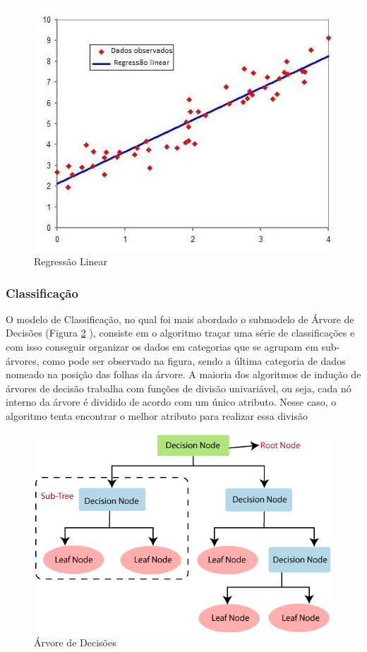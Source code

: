 \documentclass[
	article,			%
	12pt,				%
	oneside,			%
	a4paper,			%
	section=TITLE,		%
	subsection=TITLE,	%
	english,			%
	brazil,				%
	sumario=tradicional
	]{abntex2}
\begin{document}
\begin{figure}[H]
    \centering
    \includegraphics[scale=0.4]{regressao.png}
    \caption{Regressão Linear}
    \label{fig:Regressao}
\end{figure}

\subsubsection*{Classificação}
O modelo de Classificação, no qual foi mais abordado o submodelo de Árvore de Decisões (Figura \ref{fig:arvore} ), consiste em o algoritmo traçar uma série de classificações e com isso conseguir organizar os dados em categorias que se agrupam em sub-árvores, como pode ser observado na figura, sendo a última categoria de dados nomeado na posição das folhas da árvore. A maioria dos algoritmos de indução de árvores de decisão trabalha com funções de divisão univariável, ou seja, cada nó interno da árvore é dividido de acordo com um único atributo. Nesse caso, o algoritmo tenta encontrar o melhor atributo para realizar essa divisão

\begin{figure}[H]
    \centering
    \includegraphics[scale=0.3]{arvore.png}
    \caption{Árvore de Decisões}
    \label{fig:arvore}
\end{figure}
\end{document}
